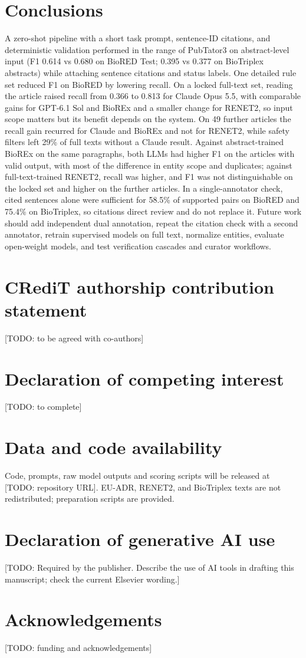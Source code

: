 \documentclass[preprint,10pt,letterpaper]{elsarticle}
\newcommand{\todo}[1]{\textcolor{stneg}{[TODO: #1]}}
\begin{document}
\section{Conclusions}
A zero-shot pipeline with a short task prompt, sentence-ID citations, and deterministic validation performed in the range of PubTator3 on abstract-level input (F1 0.614 vs 0.680 on BioRED Test; 0.395 vs 0.377 on BioTriplex abstracts) while attaching sentence citations and status labels. One detailed rule set reduced F1 on BioRED by lowering recall. On a locked full-text set, reading the article raised recall from 0.366 to 0.813 for Claude Opus 5.5, with comparable gains for GPT-6.1 Sol and BioREx and a smaller change for RENET2, so input scope matters but its benefit depends on the system. On 49 further articles the recall gain recurred for Claude and BioREx and not for RENET2, while safety filters left 29\% of full texts without a Claude result. Against abstract-trained BioREx on the same paragraphs, both LLMs had higher F1 on the articles with valid output, with most of the difference in entity scope and duplicates; against full-text-trained RENET2, recall was higher, and F1 was not distinguishable on the locked set and higher on the further articles. In a single-annotator check, cited sentences alone were sufficient for 58.5\% of supported pairs on BioRED and 75.4\% on BioTriplex, so citations direct review and do not replace it. Future work should add independent dual annotation, repeat the citation check with a second annotator, retrain supervised models on full text, normalize entities, evaluate open-weight models, and test verification cascades and curator workflows.

\section*{CRediT authorship contribution statement}
\todo{to be agreed with co-authors}

\section*{Declaration of competing interest}
\todo{to complete}

\section*{Data and code availability}
Code, prompts, raw model outputs and scoring scripts will be released at \todo{repository URL}. EU-ADR, RENET2, and BioTriplex texts are not redistributed; preparation scripts are provided.

\section*{Declaration of generative AI use}
\todo{Required by the publisher. Describe the use of AI tools in drafting this manuscript; check the current Elsevier wording.}

\section*{Acknowledgements}
\todo{funding and acknowledgements}



\end{document}
